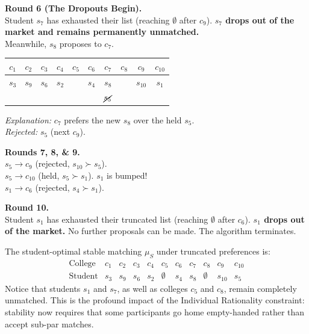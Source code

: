 {\medskip
\noindent\textbf{Round 6 (The Dropouts Begin).} \\
Student $s_7$ has exhausted their list (reaching $\emptyset$ after $c_9$). \textbf{$s_7$ drops out of the market and remains permanently unmatched.} \\
Meanwhile, $s_8$ proposes to $c_7$.
\begin{center}
\renewcommand{\arraystretch}{1.2}
\begin{tabular}{cccccccccc}
    $c_1$ & $c_2$ & $c_3$ & $c_4$ & $c_5$ & $c_6$ & $c_7$ & $c_8$ & $c_9$ & $c_{10}$ \\
    \hline
    $s_3$ & $s_9$ & $s_6$ & $s_2$ & & $s_4$ & $s_8$ & & $s_{10}$ & $s_1$ \\
     & & & & & & $\cancel{s_5}$ & & & \\
\end{tabular}
\end{center}
\textit{Explanation:} $c_7$ prefers the new $s_8$ over the held $s_5$. \\
\textit{Rejected:} $s_5$ (next $c_9$).

\medskip
\noindent\textbf{Rounds 7, 8, \& 9.} \\
$s_5 \to c_9$ (rejected, $s_{10} \succ s_5$). \\
$s_5 \to c_{10}$ (held, $s_5 \succ s_1$). $s_1$ is bumped! \\
$s_1 \to c_6$ (rejected, $s_4 \succ s_1$). 

\medskip
\noindent\textbf{Round 10.} \\
Student $s_1$ has exhausted their truncated list (reaching $\emptyset$ after $c_6$). \textbf{$s_1$ drops out of the market.} No further proposals can be made. The algorithm terminates.

\vspace{0.5cm}
\noindent The student-optimal stable matching $\mu_S$ under truncated preferences is:
\[
\begin{array}{c|cccccccccc}
  \text{College} & c_1 & c_2 & c_3 & c_4 & c_5 & c_6
                 & c_7 & c_8 & c_9 & c_{10} \\
  \hline
  \text{Student} & s_3 & s_9 & s_6 & s_2 & \emptyset
                 & s_4 & s_8 & \emptyset & s_{10} & s_5
\end{array}
\]
Notice that students $s_1$ and $s_7$, as well as colleges $c_5$ and $c_8$, remain completely unmatched. This is the profound impact of the Individual Rationality constraint: stability now requires that some participants go home empty-handed rather than accept sub-par matches.
}

